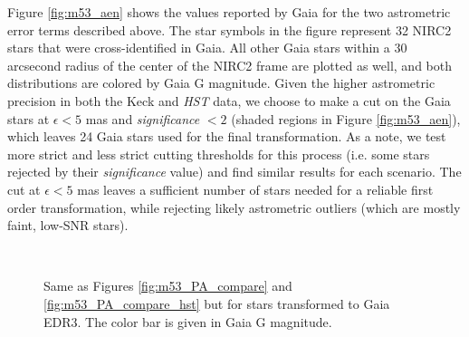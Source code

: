 \documentclass[]{spie}  %
\begin{document}
\indent Figure \ref{fig:m53_aen} shows the values reported by Gaia for the two astrometric error terms described above. The star symbols in the figure represent 32 NIRC2 stars that were cross-identified in Gaia. All other Gaia stars within a 30 arcsecond radius of the center of the NIRC2 frame are plotted as well, and both distributions are colored by Gaia G magnitude. Given the higher astrometric precision in both the Keck and \textit{HST} data, we choose to make a cut on the Gaia stars at $\epsilon < 5$ mas and \textit{significance} $< 2$ (shaded regions in Figure \ref{fig:m53_aen}), which leaves 24 Gaia stars used for the final transformation. As a note, we test more strict and less strict cutting thresholds for this process (i.e. some stars rejected by their \textit{significance} value) and find similar results for each scenario. The cut at $\epsilon <  5$ mas leaves a sufficient number of stars needed for a reliable first order transformation, while rejecting likely astrometric outliers (which are mostly faint, low-SNR stars).
\\
\begin{figure}[!h]
  \centering
  \\
  \hspace{-1cm}
  \caption{Same as Figures \ref{fig:m53_PA_compare} and \ref{fig:m53_PA_compare_hst} but for stars transformed to Gaia EDR3. The color bar is given in Gaia G magnitude.} \label{fig:m53_PA_compare_gaia}
\end{figure}
\end{document}
